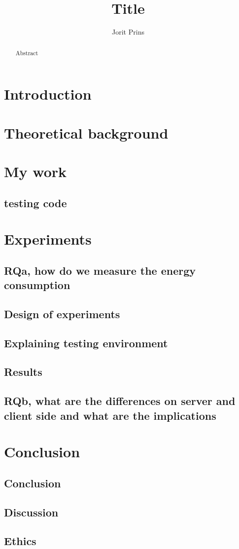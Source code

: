 \documentclass[twoside]{Style/uva-inf-bachelor-thesis}
\title{Title}
\author{Jorit Prins}
\begin{document}
\maketitle

\begin{abstract}
Abstract
\end{abstract}

\tableofcontents

\chapter{Introduction}


\chapter{Theoretical background}


\chapter{My work}
\section{testing code}

\chapter{Experiments}
\section{RQa, how do we measure the energy consumption}
\section{Design of experiments}
\section{Explaining testing environment}
\section{Results}
\section{RQb, what are the differences on server and client side and what are the implications}

\chapter{Conclusion}
\section{Conclusion}
\section{Discussion}
\section{Ethics}
\end{document}
